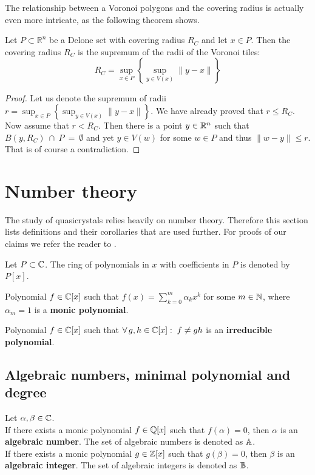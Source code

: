\documentclass[text.tex]{subfiles}
\begin{document}
The relationship between a Voronoi polygons and the covering radius is actually even more intricate, as the following theorem shows. 

\begin{theorem}\label{the_voronoiCoveringRadius}
Let $P\subset \mathbb{R}^n$ be a Delone set with covering radius $R_C$ and let $x\in P$. Then the covering radius $R_C$ is the supremum of the radii of the Voronoi tiles:  
$$R_C = \sup_{x\in P}\left\{\sup_{y\in V(x)}\lVert y-x\rVert\right\}$$
\end{theorem}
\begin{proof}
Let us denote the supremum of radii $r= \sup_{x\in P}\left\{\sup_{y\in V(x)}\lVert y-x\rVert\right\}$. We have already proved that $r\leq R_C$. Now assume that $r<R_C$. Then there is a point $y\in\mathbb{R}^n$ such that $B(y,R_C)~\cap~P~=~\emptyset$ and yet $y\in V(w)$ for some $w\in P$ and thus $\lVert w -y \rVert\leq r$. That is of course a contradiction. 
\end{proof}

\section{Number theory}\label{sec_numberTheory} %
The study of quasicrystals relies heavily on number theory. Therefore this section lists definitions and their corollaries that are used further. For proofs of our claims we refer the reader to \cite{number}. 
\begin{definition}
Let $P\subset\mathbb{C}$. The ring of polynomials in $x$ with coefficients in $P$ is denoted by $P[x]$. 
\end{definition}

\begin{definition}
Polynomial $f\in\mathbb{C}[x]$ such that $f(x) = \sum_{k=0}^m{\alpha_kx^k}$ for some $m\in\mathbb{N}$, where $\alpha_m = 1$ is a \textbf{monic polynomial}. 
\end{definition}

\begin{definition}
Polynomial $f\in\mathbb{C}[x]$ such that $\forall\, g,h\in\mathbb{C}[x]:\;f \neq gh$ is an \textbf{irreducible polynomial}. 
\end{definition}

\subsection{Algebraic numbers, minimal polynomial and degree}
\begin{definition}Let $\alpha, \beta\in\mathbb{C}$.\\
If there exists a monic polynomial $f\in\mathbb{Q}[x]$ such that $f(\alpha) = 0$, then $\alpha$ is an \textbf{algebraic number}. The set of algebraic numbers is denoted as $\mathbb{A}$. \\
If there exists a monic polynomial $g\in\mathbb{Z}[x]$ such that $g(\beta) = 0$, then $\beta$ is an \textbf{algebraic integer}.  The set of algebraic integers is denoted as $\mathbb{B}$. 
\end{definition}
\end{document}
